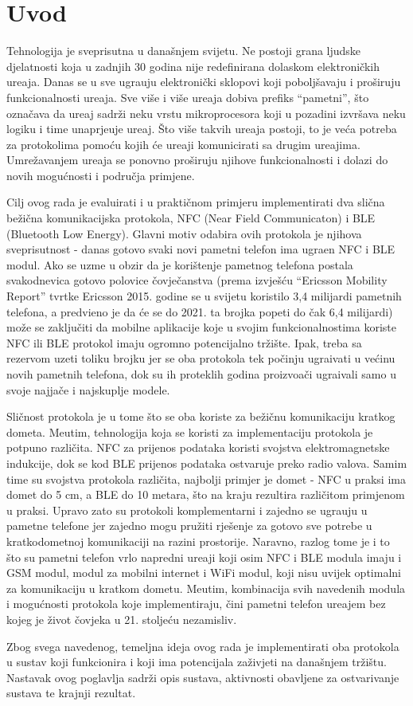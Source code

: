 \chapter{Uvod}

Tehnologija je sveprisutna u dana\v{s}njem svijetu. Ne postoji grana ljudske djelatnosti koja u zadnjih 30 godina nije redefinirana dolaskom elektroni\v{c}kih ure\dj aja. Danas se u sve ugra\dj uju elektroni\v{c}ki sklopovi koji pobolj\v{s}avaju i pro\v{s}iruju funkcionalnosti ure\dj aja. Sve vi\v{s}e i vi\v{s}e ure\dj aja dobiva prefiks ``pametni'', \v{s}to ozna\v{c}ava da ure\dj aj sadr\v{z}i neku vrstu mikroprocesora koji u pozadini izvr\v{s}ava neku logiku i time unaprje\dj uje ure\dj aj. \v{S}to vi\v{s}e takvih ure\dj aja postoji, to je ve\'{c}a potreba za protokolima pomo\'{c}u kojih \'{c}e ure\dj aji komunicirati sa drugim ure\dj ajima. Umre\v{z}avanjem ure\dj aja se ponovno pro\v{s}iruju njihove funkcionalnosti i dolazi do novih mogu\'{c}nosti i podru\v{c}ja primjene.

Cilj ovog rada je evaluirati i u prakti\v{c}nom primjeru implementirati dva sli\v{c}na be\v{z}i\v{c}na komunikacijska protokola, NFC (Near Field Communicaton) i BLE (Bluetooth Low Energy). Glavni motiv odabira ovih protokola je njihova sveprisutnost -  danas gotovo svaki novi pametni telefon ima ugra\dj en NFC i BLE modul. Ako se uzme u obzir da je kori\v{s}tenje pametnog telefona postala svakodnevica gotovo polovice \v{c}ovje\v{c}anstva (prema izvje\v{s}\'{c}u ``Ericsson Mobility Report'' tvrtke Ericsson \cite{mobilityReport} 2015. godine se u svijetu koristilo 3,4 milijardi pametnih telefona, a predvi\dj eno je da \'{c}e se do 2021. ta brojka popeti do \v{c}ak 6,4 milijardi) mo\v{z}e se zaklju\v{c}iti da mobilne aplikacije koje u svojim funkcionalnostima koriste NFC ili BLE protokol imaju ogromno potencijalno tr\v{z}i\v{s}te. Ipak, treba sa rezervom uzeti toliku brojku jer se oba protokola tek po\v{c}inju ugra\dj ivati u ve\'{c}inu novih pametnih telefona, dok su ih proteklih godina proizvo\dj a\v{c}i ugra\dj ivali samo u svoje najja\v{c}e i najskuplje modele.

Sli\v{c}nost protokola je u tome \v{s}to se oba koriste za be\v{z}i\v{c}nu komunikaciju kratkog dometa. Me\dj utim, tehnologija koja se koristi za implementaciju protokola je potpuno razli\v{c}ita. NFC za prijenos podataka koristi svojstva elektromagnetske indukcije, dok se kod BLE prijenos podataka ostvaruje preko radio valova. Samim time su svojstva protokola razli\v{c}ita, najbolji primjer je domet - NFC u praksi ima domet do 5 cm, a BLE do 10 metara, \v{s}to na kraju rezultira razli\v{c}itom primjenom u praksi. Upravo zato su protokoli komplementarni i zajedno se ugra\dj uju u pametne telefone jer zajedno mogu pru\v{z}iti rje\v{s}enje za gotovo sve potrebe u kratkodometnoj komunikaciji na razini prostorije. Naravno, razlog tome je i to \v{s}to su pametni telefon vrlo napredni ure\dj aji koji osim NFC i BLE modula imaju i GSM modul, modul za mobilni internet i WiFi modul, koji nisu uvijek optimalni za komunikaciju u kratkom dometu. Me\dj utim, kombinacija svih navedenih modula i mogu\'{c}nosti protokola koje implementiraju, \v{c}ini pametni telefon ure\dj ajem bez kojeg je \v{z}ivot \v{c}ovjeka u 21. stolje\'{c}u nezamisliv.

Zbog svega navedenog, temeljna ideja ovog rada je implementirati oba protokola u sustav koji funkcionira i koji ima potencijala za\v{z}ivjeti na dana\v{s}njem tr\v{z}i\v{s}tu. Nastavak ovog poglavlja sadr\v{z}i opis sustava, aktivnosti obavljene za ostvarivanje sustava te krajnji rezultat.

